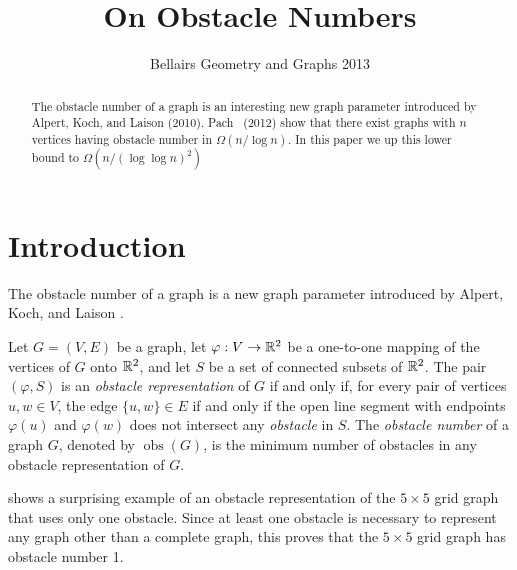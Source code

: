 \documentclass{patmorin}
\title{On Obstacle Numbers}
\author{Bellairs Geometry and Graphs 2013}
\DeclareMathOperator{\obs}{obs}
\begin{document}
\maketitle

\begin{abstract}
The obstacle number of a graph is an interesting new graph parameter
introduced by Alpert, Koch, and Laison (2010).  Pach \etal\ (2012)
show that there exist graphs with $n$ vertices having obstacle
number in $\Omega(n/\log n)$. In this paper we up this lower bound to
$\Omega(n/(\log\log n)^2)$
\end{abstract}

\newpage

\section{Introduction}

The obstacle number of a graph is a new graph parameter introduced by
Alpert, Koch, and Laison \cite{alpert.koch.ea:obstacle}.

Let $G=(V,E)$ be a graph, let $\varphi:V\to \mathbb{R}^2$ be a one-to-one mapping
of the vertices of $G$ onto $\mathbb{R}^2$, and let $S$ be a set of connected
subsets of $\mathbb{R}^2$.  The pair $(\varphi,S)$ is an \emph{obstacle
representation} of $G$ if and only if, for every pair of vertices
$u,w\in V$, the edge $\{u,w\}\in E$ if and only if the open line segment
with endpoints $\varphi(u)$ and $\varphi(w)$ does not intersect any
\emph{obstacle} in $S$.  The \emph{obstacle number} of a graph $G$,
denoted by $\obs(G)$, is the minimum number of obstacles in any obstacle
representation of $G$.

 shows a surprising example of an obstacle
representation of the $5\times 5$ grid graph that uses only one obstacle.
Since at least one obstacle is necessary to represent any graph other
than a complete graph, this proves that the $5\times 5$ grid graph has
obstacle number 1.
\end{document}
